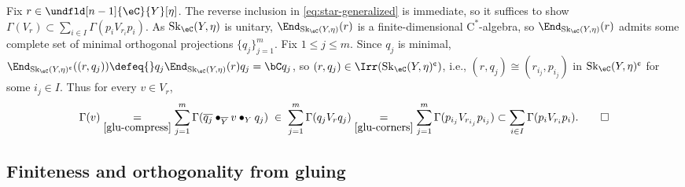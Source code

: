 \documentclass[12pt,reqno]{amsart}
\newcommand{\Sk}{\mathrm{Sk}}
\newcommand{\C}{\eC}
\newcommand{\blt}{\bullet}
\newcommand{\fcj}[1]{\overline{#1}}
\newcommand{\orev}{\overline}
\newcommand{\Cstar}{\ensuremath{\mathrm{C}^{*}}}
\newcommand{\cent}{\textup{\textcent}}
\begin{document}
\begin{pf}
Fix $r\in \undfld[n-1]{\C}{Y}[\eta]$. The reverse inclusion in \cref{eq:star-generalized} is immediate, so it suffices to show $\Gamma(V_r)\subset\sum_{i\in  I}\Gamma(p_iV_{r_i}p_i)$. As $\Sk_\C(Y,\eta)$ is unitary, $\End_{\Sk_\C(Y,\eta)}(r)$ is a finite-dimensional $\Cstar$-algebra, so $\End_{\Sk_\C(Y,\eta)}(r)$ admits some complete set of minimal orthogonal projections $\{q_j\}_{j=1}^{m}$. Fix $1\leq j\leq m$. Since $q_j$ is minimal, $\End_{\Sk_\C(Y,\eta)^\cent}((r,q_j))\defeq{} q_j\End_{\Sk_\C(Y,\eta)}(r)q_j=\bC q_j$, so $(r,q_j)\in\Irr(\Sk_\C(Y,\eta)^\cent)$, i.e., $(r,q_j)\cong(r_{i_j},p_{i_j})$ in $\Sk_\C(Y,\eta)^\cent$ for some $i_j\in I$. Thus for every $v\in V_r$, 
\[
    \Gamma(v)
    \underset{\eqref{glu-compress}}{=}
    \sum_{j=1}^m\Gamma(\fcj{q_j}\blt_{\orev Y}v\blt_Yq_j)
    \;\in\;
    \sum_{j=1}^m\Gamma(q_jV_rq_j)
    \underset{\eqref{glu-corners}}{=}
    \sum_{j=1}^m\Gamma(p_{i_j}V_{r_{i_j}}p_{i_j})
    \subset
    \sum_{i\in I}\Gamma(p_iV_{r_i}p_i).\qedhere
\]
\end{pf}

\subsection{Finiteness and orthogonality from gluing}
\label{subsec:finiteness-self-gluing}

\
\end{document}
